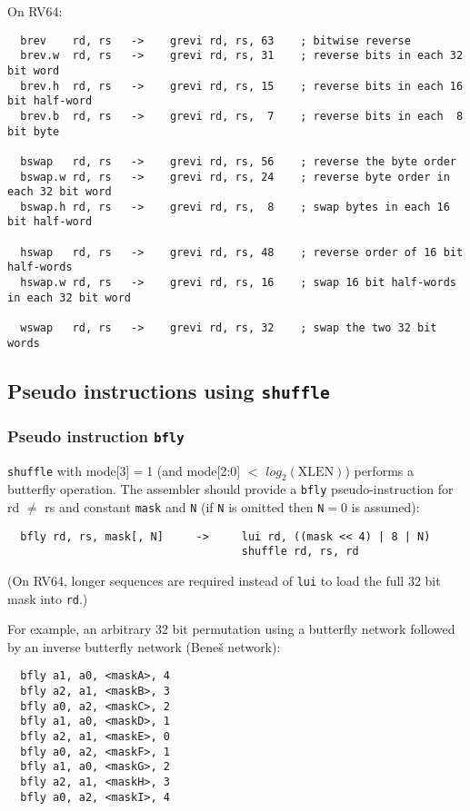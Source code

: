 On RV64:

\begin{verbatim}
  brev    rd, rs   ->    grevi rd, rs, 63    ; bitwise reverse
  brev.w  rd, rs   ->    grevi rd, rs, 31    ; reverse bits in each 32 bit word
  brev.h  rd, rs   ->    grevi rd, rs, 15    ; reverse bits in each 16 bit half-word
  brev.b  rd, rs   ->    grevi rd, rs,  7    ; reverse bits in each  8 bit byte

  bswap   rd, rs   ->    grevi rd, rs, 56    ; reverse the byte order
  bswap.w rd, rs   ->    grevi rd, rs, 24    ; reverse byte order in each 32 bit word
  bswap.h rd, rs   ->    grevi rd, rs,  8    ; swap bytes in each 16 bit half-word

  hswap   rd, rs   ->    grevi rd, rs, 48    ; reverse order of 16 bit half-words
  hswap.w rd, rs   ->    grevi rd, rs, 16    ; swap 16 bit half-words in each 32 bit word

  wswap   rd, rs   ->    grevi rd, rs, 32    ; swap the two 32 bit words
\end{verbatim}

\subsection{Pseudo instructions using {\tt shuffle}}

\subsubsection{Pseudo instruction {\tt bfly}}

{\tt shuffle} with mode[3]$=$1 (and mode[2:0] $<$ $log_2(\textrm{XLEN})$) performs
a butterfly operation. The assembler should provide a {\tt bfly} pseudo-instruction
for rd $\neq$ rs and constant {\tt mask} and {\tt N} (if {\tt N} is omitted then
{\tt N}$=$0 is assumed):

\begin{verbatim}
  bfly rd, rs, mask[, N]     ->     lui rd, ((mask << 4) | 8 | N)
                                    shuffle rd, rs, rd
\end{verbatim}

(On RV64, longer sequences are required instead of {\tt lui} to load the full
32 bit mask into {\tt rd}.)

For example, an arbitrary 32 bit permutation using a butterfly network followed
by an inverse butterfly network (Bene{\v s} network):

\begin{verbatim}
  bfly a1, a0, <maskA>, 4
  bfly a2, a1, <maskB>, 3
  bfly a0, a2, <maskC>, 2
  bfly a1, a0, <maskD>, 1
  bfly a2, a1, <maskE>, 0
  bfly a0, a2, <maskF>, 1
  bfly a1, a0, <maskG>, 2
  bfly a2, a1, <maskH>, 3
  bfly a0, a2, <maskI>, 4
\end{verbatim}

